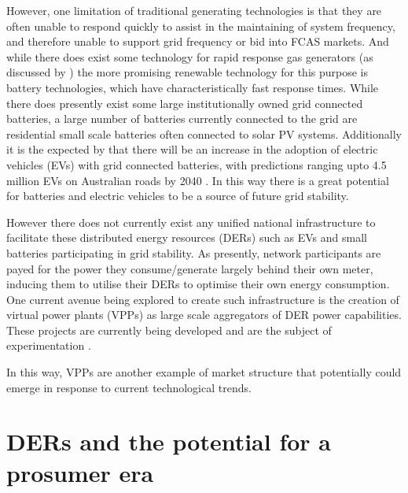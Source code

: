 However, one limitation of traditional generating technologies is that they are often unable to respond quickly to assist in the maintaining of system frequency, and therefore unable to support grid frequency or bid into FCAS markets.
And while there does exist some technology for rapid response gas generators (as discussed by \cite{GONZALEZSALAZAR20181497}) the more promising renewable technology for this purpose is battery technologies, which have characteristically fast response times.
While there does presently exist some large institutionally owned grid connected batteries, a large number of batteries currently connected to the grid are residential small scale batteries often connected to solar PV systems.
Additionally it is the expected by \cite{australianenergymarketoperatorlimited2019} that there will be an increase in the adoption of electric vehicles (EVs) with grid connected batteries, with predictions ranging upto 4.5 million EVs on Australian roads by 2040 .
In this way there is a great potential for batteries and electric vehicles to be a source of future grid stability.

However there does not currently exist any unified national infrastructure to facilitate these distributed energy resources (DERs) such as EVs and small batteries participating in grid stability.
As presently, network participants are payed for the power they consume/generate largely behind their own meter, inducing them to utilise their DERs to optimise their own energy consumption.
One current avenue being explored to create such infrastructure is the creation of virtual power plants (VPPs) as large scale aggregators of DER power capabilities. These projects are currently being developed and are the subject of experimentation \citep{australianenergymarketoperatorlimited20188}.


In this way, VPPs are another example of market structure that potentially could emerge in response to current technological trends.

\section{DERs and the potential for a prosumer era}

